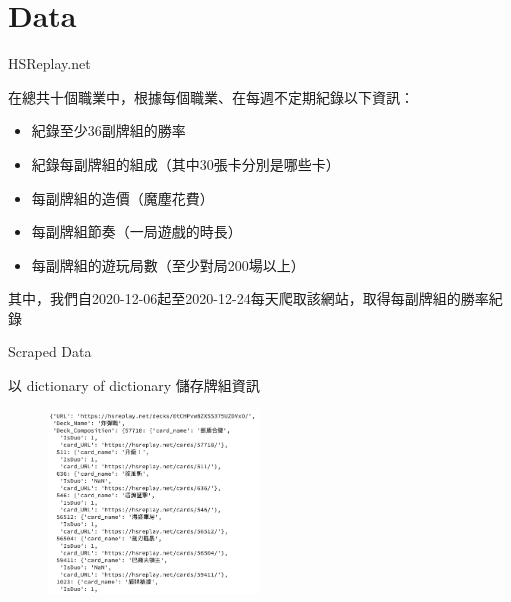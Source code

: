\documentclass[12pt]{beamer}
\begin{document}
\section{Data}

\begin{frame}[fragile]{HSReplay.net}
	
	在總共十個職業中，根據每個職業、在每週不定期紀錄以下資訊：
	\begin{itemize}
		\item 紀錄至少36副牌組的勝率
		\item 紀錄每副牌組的組成（其中30張卡分別是哪些卡）
		\item 每副牌組的造價（魔塵花費）
		\item 每副牌組節奏（一局遊戲的時長）
		\item 每副牌組的遊玩局數（至少對局200場以上）
	\end{itemize}

	其中，我們自2020-12-06起至2020-12-24每天爬取該網站，取得每副牌組的勝率紀錄

\end{frame}

\begin{frame}[fragile]{Scraped Data}

以 dictionary of dictionary 儲存牌組資訊

	\begin{figure}
		\begin{center}
			\includegraphics[width=0.5\textwidth]{figure/f03.png}
		\end{center}
	\end{figure}

\end{frame}
\end{document}
